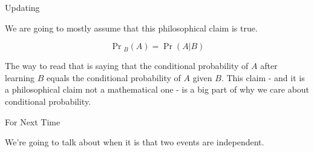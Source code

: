 \documentclass[
  ignorenonframetext,
]{beamer}
\renewcommand{\,}{\text{, }}
\begin{document}
\begin{frame}{Updating}
\protect\hypertarget{updating}{}

We are going to mostly assume that this philosophical claim is true.

\[
\Pr{}_B(A) = \Pr(A | B)
\]

The way to read that is saying that the conditional probability of \(A\)
after learning \(B\) equals the conditional probability of \(A\) given
\(B\). This claim - and it is a philosophical claim not a mathematical
one - is a big part of why we care about conditional probability.

\end{frame}

\begin{frame}{For Next Time}
\protect\hypertarget{for-next-time}{}

We're going to talk about when it is that two events are independent.

\end{frame}
\end{document}
